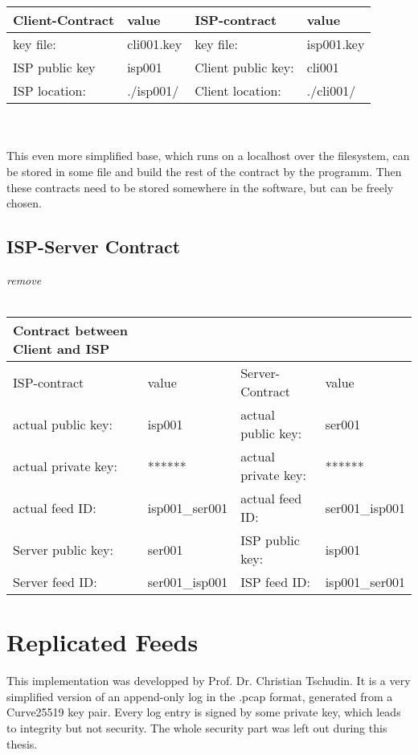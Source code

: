\\\\
\begin{tabular}{llll} \toprule
    Client-Contract&value&ISP-contract&value\\ \midrule
    key file:& cli001.key &  key file: &isp001.key  \\ 
    ISP public key&isp001&Client public key:&cli001\\
    ISP location:&.\slash isp001\slash &Client location:& .\slash cli001\slash \\\bottomrule
\end{tabular}
\\\\
This even more simplified base, which runs on a localhost over the filesystem, can be stored in some file and build the rest of the contract by the programm. Then these contracts need to be stored somewhere in the software, but can be freely chosen.
\subsection{ISP-Server Contract}
\textit{remove}\\\\

\begin{tabular}{llll} \toprule
    Contract between Client and ISP&&&\\\midrule
    ISP-contract&value&Server-Contract&value\\ \midrule
    actual public key:& isp001 &  actual public key: &ser001   \\ 
    actual private key:& ****** & actual private key:& ******  \\
    actual feed ID:& isp001\_ser001 &actual feed ID:&ser001\_isp001\\ 
    Server public key:&ser001&ISP public key:&isp001\\
    Server feed ID:&ser001\_isp001&ISP feed ID:&isp001\_ser001\\\bottomrule
\end{tabular}
\section{Replicated Feeds}
This implementation was developped by Prof. Dr. Christian Tschudin. It is a very simplified version of an append-only log in the .pcap format, generated from a Curve25519 key pair. Every log entry is signed by some private key, which leads to integrity but not security. The whole security part was left out during this thesis.
